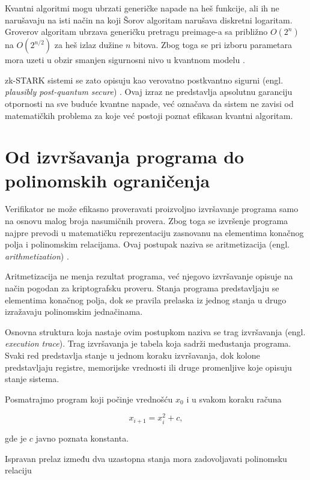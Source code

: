 Kvantni algoritmi mogu ubrzati generičke napade na heš funkcije, ali ih ne
narušavaju na isti način na koji Šorov algoritam narušava diskretni logaritam.
Groverov algoritam ubrzava generičku pretragu preimage-a sa približno
\(O(2^n)\) na \(O(2^{n/2})\) za heš izlaz dužine \(n\) bitova. Zbog toga se
pri izboru parametara mora uzeti u obzir smanjen sigurnosni nivo u kvantnom
modelu \cite{postquantumcryptography:2009}.

zk-STARK sistemi se zato opisuju kao verovatno postkvantno sigurni
(engl. \textit{plausibly post-quantum secure}) \cite{stark2018}. Ovaj izraz ne
predstavlja apsolutnu garanciju otpornosti na sve buduće kvantne napade, već
označava da sistem ne zavisi od matematičkih problema za koje već postoji
poznat efikasan kvantni algoritam.

\section{Od izvršavanja programa do polinomskih ograničenja}

Verifikator ne može efikasno proveravati proizvoljno izvršavanje programa samo
na osnovu malog broja nasumičnih provera. Zbog toga se izvršenje programa najpre
prevodi u matematičku reprezentaciju zasnovanu na elementima konačnog polja i
polinomskim relacijama. Ovaj postupak naziva se aritmetizacija
(engl. \textit{arithmetization}) \cite{stark2018}.

Aritmetizacija ne menja rezultat programa, već njegovo izvršavanje opisuje na
način pogodan za kriptografsku proveru. Stanja programa predstavljaju se
elementima konačnog polja, dok se pravila prelaska iz jednog stanja u drugo
izražavaju polinomskim jednačinama.

Osnovna struktura koja nastaje ovim postupkom naziva se trag izvršavanja
(engl. \textit{execution trace}). Trag izvršavanja je tabela koja sadrži
međustanja programa. Svaki red predstavlja stanje u jednom koraku izvršavanja,
dok kolone predstavljaju registre, memorijske vrednosti ili druge promenljive
koje opisuju stanje sistema.

Posmatrajmo program koji počinje vrednošću \(x_0\) i u svakom koraku računa

\begin{equation}
    x_{i+1} = x_i^2 + c,
\end{equation}

gde je \(c\) javno poznata konstanta.

Ispravan prelaz između dva uzastopna stanja mora zadovoljavati polinomsku
relaciju

